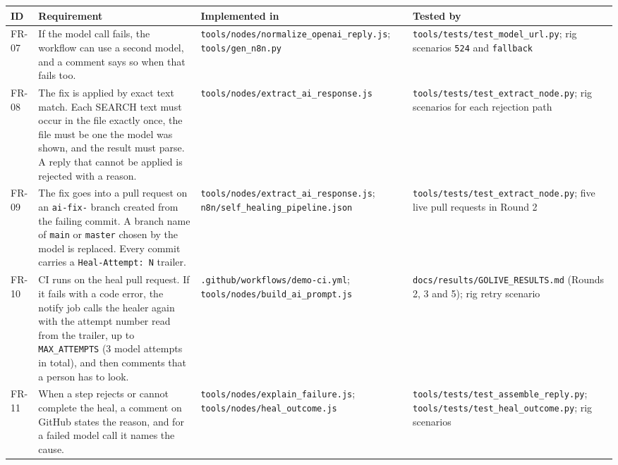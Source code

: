 \begin{table}[!htbp]
\centering
\footnotesize
\begin{tabularx}{\linewidth}{>{\raggedright\arraybackslash}p{1.2cm}>{\raggedright\arraybackslash}X>{\raggedright\arraybackslash}X>{\raggedright\arraybackslash}X}
\toprule
\textbf{ID} & \textbf{Requirement} & \textbf{Implemented in} & \textbf{Tested by} \\
\midrule
FR-07 & If the model call fails, the workflow can use a second model, and a comment says so when that fails too. & \texttt{tools/\allowbreak{}nodes/\allowbreak{}normalize\_\allowbreak{}openai\_\allowbreak{}reply.js}; \texttt{tools/\allowbreak{}gen\_\allowbreak{}n8n.py} & \texttt{tools/\allowbreak{}tests/\allowbreak{}test\_\allowbreak{}model\_\allowbreak{}url.py}; rig scenarios \texttt{524} and \texttt{fallback} \\
FR-08 & The fix is applied by exact text match. Each SEARCH text must occur in the file exactly once, the file must be one the model was shown, and the result must parse. A reply that cannot be applied is rejected with a reason. & \texttt{tools/\allowbreak{}nodes/\allowbreak{}extract\_\allowbreak{}ai\_\allowbreak{}response.js} & \texttt{tools/\allowbreak{}tests/\allowbreak{}test\_\allowbreak{}extract\_\allowbreak{}node.py}; rig scenarios for each rejection path \\
FR-09 & The fix goes into a pull request on an \texttt{ai-fix-} branch created from the failing commit. A branch name of \texttt{main} or \texttt{master} chosen by the model is replaced. Every commit carries a \texttt{Heal-Attempt: N} trailer. & \texttt{tools/\allowbreak{}nodes/\allowbreak{}extract\_\allowbreak{}ai\_\allowbreak{}response.js}; \texttt{n8n/\allowbreak{}self\_\allowbreak{}healing\_\allowbreak{}pipeline.json} & \texttt{tools/\allowbreak{}tests/\allowbreak{}test\_\allowbreak{}extract\_\allowbreak{}node.py}; five live pull requests in Round 2 \\
FR-10 & CI runs on the heal pull request. If it fails with a code error, the notify job calls the healer again with the attempt number read from the trailer, up to \texttt{MAX\_ATTEMPTS} (3 model attempts in total), and then comments that a person has to look. & \texttt{.github/\allowbreak{}workflows/\allowbreak{}demo-ci.yml}; \texttt{tools/\allowbreak{}nodes/\allowbreak{}build\_\allowbreak{}ai\_\allowbreak{}prompt.js} & \texttt{docs/\allowbreak{}results/\allowbreak{}GOLIVE\_\allowbreak{}RESULTS.md} (Rounds 2, 3 and 5); rig retry scenario \\
FR-11 & When a step rejects or cannot complete the heal, a comment on GitHub states the reason, and for a failed model call it names the cause. & \texttt{tools/\allowbreak{}nodes/\allowbreak{}explain\_\allowbreak{}failure.js}; \texttt{tools/\allowbreak{}nodes/\allowbreak{}heal\_\allowbreak{}outcome.js} & \texttt{tools/\allowbreak{}tests/\allowbreak{}test\_\allowbreak{}assemble\_\allowbreak{}reply.py}; \texttt{tools/\allowbreak{}tests/\allowbreak{}test\_\allowbreak{}heal\_\allowbreak{}outcome.py}; rig scenarios \\

\end{tabularx}
\end{table}
